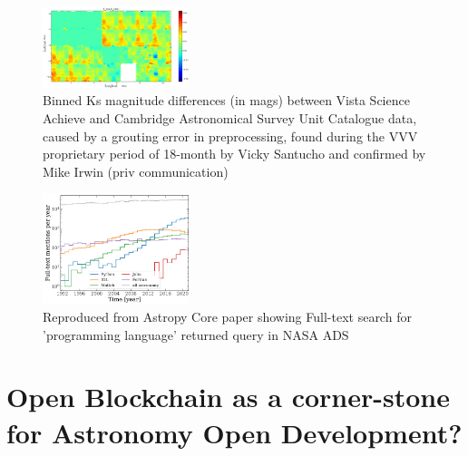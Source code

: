 \documentclass[final,5p,times,twocolumn,authoryear]{elsarticle}
\begin{document}
\begin{figure}
    \centering
    \includegraphics[width=0.38\textwidth]{figs/mapa_dif_Kvsa_Kcasu_grid80_1}
    \vspace*{-0.2cm}
    \caption{Binned Ks magnitude differences (in mags) between Vista Science Achieve and Cambridge Astronomical Survey Unit Catalogue data, caused by a grouting error in preprocessing, found during the VVV proprietary period of 18-month by Vicky Santucho and confirmed by Mike Irwin (priv communication)}
    \label{fig:mapa_dif_Kvsa_Kcasu_grid80_1}
\end{figure}


\begin{figure}
    \centering
    \includegraphics[width=0.38\textwidth]{figs/2206.14220.jpg}
    \vspace*{-0.3cm}
    \caption{Reproduced from Astropy Core paper showing Full-text search for 'programming language' returned query in NASA ADS}
    \label{fig:astropy}
\end{figure}

\section{Open Blockchain as a corner-stone for Astronomy Open Development?}
\label{sec:bc_review}
\end{document}
